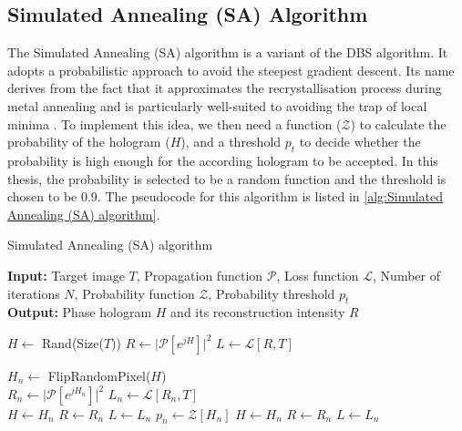 \subsection{Simulated Annealing (SA) Algorithm}\label{sec:Simulated Annealing (SA) Algorithm}
The Simulated Annealing (SA) algorithm \cite{Kirkpatrick1983} is a variant of the DBS algorithm. It adopts a probabilistic approach to avoid the steepest gradient descent. Its name derives from the fact that it approximates the recrystallisation process during metal annealing and is particularly well-suited to avoiding the trap of local minima \cite{Yang2009}. To implement this idea, we then need a function ($\mathcal{Z}$) to calculate the probability of the hologram ($H$), and a threshold $p_t$ to decide whether the probability is high enough for the according hologram to be accepted. In this thesis, the probability is selected to be a random function and the threshold is chosen to be 0.9. The pseudocode for this algorithm is listed in \cref{alg:Simulated Annealing (SA) algorithm}.
\begin{algorithm}[H]
  \caption{Simulated Annealing (SA) algorithm}\label{alg:Simulated Annealing (SA) algorithm}
  \textbf{Input:} Target image $T$, Propagation function $\mathcal{P}$, Loss function $\mathcal{L}$, Number of iterations $N$, Probability function $\mathcal{Z}$, Probability threshold $p_t$ \\
  \textbf{Output:} Phase hologram $H$ and its reconstruction intensity $R$
  \begin{algorithmic}
    \State $H \gets$ Rand(Size($T$))
    \State $R \gets \vert \mathcal{P}[e^{jH}] \vert ^2$
    \State $L \gets \mathcal{L} [R, T]$

    \State $H_n \gets$ FlipRandomPixel($H$)\\
    \State $R_n \gets \vert \mathcal{P}[e^{jH_n}] \vert ^2$
    \State $L_n \gets \mathcal{L} [R_n, T]$\\
    \State $H \gets H_n$
    \State $R \gets R_n$
    \State $L \gets L_n$
    \Else
    \State $p_n \gets \mathcal{Z}[H_n]$
    \State $H \gets H_n$
    \State $R \gets R_n$
    \State $L \gets L_n$
    \EndIf
    \EndIf
    \EndFor
  \end{algorithmic}
\end{algorithm}

